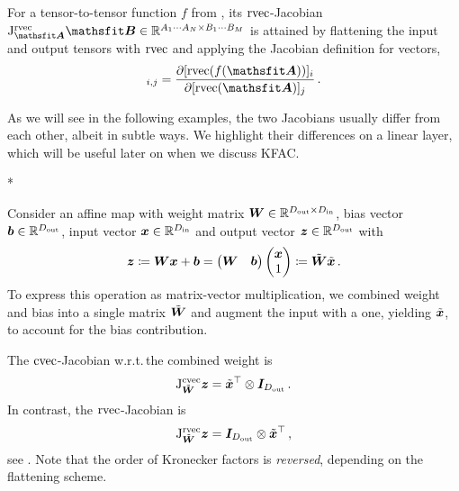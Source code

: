 \begin{definition}\label{def:rvec_jacobian}
  For a tensor-to-tensor function $f$ from , its $\operatorname{rvec}$-Jacobian $\jac^{\rvec}_{\tA}\tB \in \sR^{A_1 \cdots A_N \times B_1 \cdots B_M}$ is attained by flattening the input and output tensors with $\operatorname{rvec}$ and applying the Jacobian definition for vectors,
  \begin{align*}
    [\jac^{\rvec}_{\tA}\tB]_{i,j}
    =
    \frac{\partial [\rvec(f(\tA))]_i}{\partial [\rvec(\tA)]_j}\,.
  \end{align*}
\end{definition}

As we will see in the following examples, the two Jacobians usually differ from each other, albeit in subtle ways. We highlight their differences on a linear layer, which will be useful later on when we discuss KFAC.

\switchcolumn[1]*
\switchcolumn[0]

\begin{example}
  Consider an affine map with weight matrix ${\bm{W}} \in {\mathbb{R}}^{D_{\text{out}} \times D_{\text{in}}}$, bias vector ${\bm{b}} \in {\mathbb{R}}^{D_{\text{out}}}$, input vector ${\bm{x}} \in {\mathbb{R}}^{D_{\text{in}}}$ and output vector ${\bm{z}} \in {\mathbb{R}}^{D_{\text{out}}}$ with
  \begin{align*}
    {\bm{z}}
    \coloneqq
    {\bm{W}} {\bm{x}} + {\bm{b}}
    =
    \begin{pmatrix}
      {\bm{W}} & {\bm{b}}
    \end{pmatrix}
    \begin{pmatrix}
      {\bm{x}} \\ 1
    \end{pmatrix}
    \coloneqq
    \tilde{{\bm{W}}}
    \tilde{{\bm{x}}}\,.
  \end{align*}
  To express this operation as matrix-vector multiplication, we combined weight and bias into a single matrix $\tilde{{\bm{W}}}$ and augment the input with a one, yielding $\tilde{{\bm{x}}}$, to account for the bias contribution.

  The $\operatorname{cvec}$-Jacobian w.r.t.\,the combined weight is
  \begin{align*}
    \mathrm{J}^{\operatorname{cvec}}_{\tilde{{\bm{W}}}}{\bm{z}}
    =
    \tilde{{\bm{x}}}^{\top}
    \otimes
    {\bm{I}}_{D_{\text{out}}}\,.
  \end{align*}
  In contrast, the $\operatorname{rvec}$-Jacobian is
  \begin{align*}
    \mathrm{J}^{\operatorname{rvec}}_{\tilde{{\bm{W}}}}{\bm{z}}
    =
    {\bm{I}}_{D_{\text{out}}}
    \otimes
    \tilde{{\bm{x}}}^{\top}\,,
  \end{align*}
  see .
  Note that the order of Kronecker factors is \emph{reversed}, depending on the flattening scheme.
\end{example}

